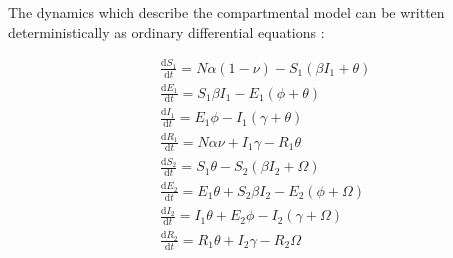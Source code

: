 \documentclass[../Paper.tex]{subfiles}
\begin{document}
  The dynamics which describe the compartmental model can be written deterministically
  as ordinary differential equations : 

  \begin{align}
    &\frac{\mathrm{d} S_{1}}{\mathrm{d} t} = N\alpha\left(1 - \nu \right) - S_{1}\left(\beta I_{1} + \theta \right)\\[12pt]
    &\frac{\mathrm{d} E_{1}}{\mathrm{d} t} = S_{1}\beta I_{1} - E_{1}\left( \phi + \theta \right)\\[12pt]
    &\frac{\mathrm{d} I_{1}}{\mathrm{d} t} = E_{1}\phi - I_{1}\left(\gamma + \theta \right)\\[12pt]
    &\frac{\mathrm{d} R_{1}}{\mathrm{d} t} = N\alpha\nu + I_{1}\gamma - R_{1}\theta\\[12pt]
    &\frac{\mathrm{d} S_{2}}{\mathrm{d} t} = S_{1}\theta - S_{2}\left(\beta I_{2} + \Omega \right)\\[12pt]
    &\frac{\mathrm{d} E_{2}}{\mathrm{d} t} = E_{1}\theta + S_{2}\beta I_{2} - E_{2}\left( \phi + \Omega \right)\\[12pt]
    &\frac{\mathrm{d} I_{2}}{\mathrm{d} t} = I_{1}\theta + E_{2}\phi - I_{2}\left(\gamma + \Omega \right)\\[12pt]
    &\frac{\mathrm{d} R_{2}}{\mathrm{d} t} = R_{1}\theta + I_{2}\gamma - R_{2}\Omega
  \end{align}

  \justifying
  \clearpage
\end{document}
